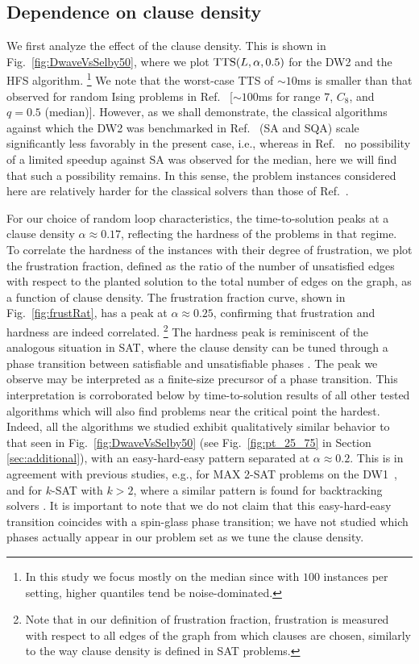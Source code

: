 \subsection{Dependence on clause density}
We first analyze the effect of the clause density. This is shown in Fig.~\ref{fig:DwaveVsSelby50}, where we plot $\textrm{TTS}(L,\alpha,0.5)$ for the DW2 and the HFS algorithm.%
\footnote{In this study we focus mostly on the median since with $100$ instances per setting, higher quantiles tend be noise-dominated.}
We note that the worst-case TTS of $\sim\!10$ms is smaller than that observed for random Ising problems in Ref.~\cite{speedup} [$\sim\!100$ms for range $7$, $C_8$, and $q=0.5$ (median)]. However, as we shall demonstrate, the classical algorithms against which the DW2 was benchmarked in Ref.~\cite{speedup} (SA and SQA) scale significantly less favorably in the present case, i.e., whereas in Ref.~\cite{speedup} no possibility of a limited speedup against SA was observed for the median, here we will find that such a possibility remains. In this sense, the problem instances considered here are relatively harder for the classical solvers than those of Ref.~\cite{speedup}.

For our choice of random loop characteristics, the time-to-solution peaks at a clause density $\alpha\approx 0.17$, reflecting the hardness of the problems in that regime. To correlate the hardness of the instances with their degree of frustration, we plot the frustration fraction, defined as the ratio of the number of unsatisfied edges with respect to the planted solution to the total number of edges on the graph, as a function of clause density. The frustration fraction curve, shown in Fig.~\ref{fig:frustRat}, has a peak at $\alpha \approx 0.25$, confirming that frustration and hardness are indeed correlated.%
\footnote{Note that in our definition of frustration fraction, frustration is measured with respect to all edges of the graph from which clauses are chosen, similarly to the way clause density is defined in SAT problems.}
The hardness peak is reminiscent of the analogous situation in SAT, where the clause density
can be tuned through a phase transition between satisfiable and unsatisfiable phases \cite{Bollobas:2001}. The peak we observe may be interpreted as a finite-size precursor of a phase transition. This interpretation is corroborated below by time-to-solution results of all other tested algorithms which will also find problems near the critical point the hardest. Indeed, all the  algorithms we studied exhibit qualitatively similar behavior to that seen in Fig.~\ref{fig:DwaveVsSelby50} (see Fig.~\ref{fig:pt_25_75} in Section \ref{sec:additional}),
with an easy-hard-easy pattern separated at $\alpha\approx 0.2$. This is in agreement with previous studies, e.g., for MAX 2-SAT problems on the DW1~\cite{MAX2SAT}, and for $k$-SAT with $k > 2$, where a similar pattern is found
for backtracking solvers \cite{monasson}. It is important to note that we do not claim that this easy-hard-easy transition coincides with a spin-glass phase transition; we have not studied which phases actually appear in our problem set as we tune the clause density.

